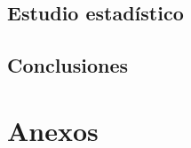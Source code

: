 \documentclass[a4paper,11pt]{scrbook} %
\begin{document}
\chapter{Estudio estadístico}
\label{section:parteEmpirica}





\backmatter                                               %

\chapter{Conclusiones}







\mainmatter                                               %
\part*{Anexos}
\begin{appendices}
\renewcommand{\thechapter}{\arabic{chapter}}

\end{appendices}
\end{document}

